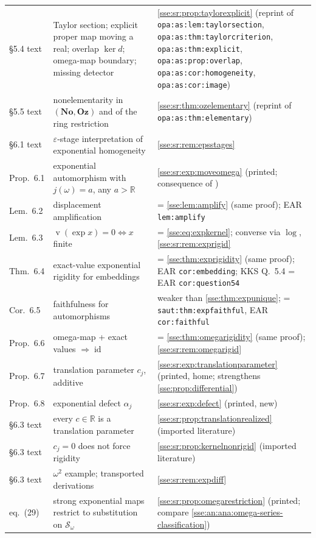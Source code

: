 \documentclass[11pt,a4paper]{article}
\numberwithin{equation}{section}
\theoremstyle{plain}
\theoremstyle{definition}
\theoremstyle{remark}
\newcommand{\No}{\mathbf{No}}
\newcommand{\Oz}{\mathbf{Oz}}
\newcommand{\R}{\mathbb{R}}
\newcommand{\id}{\operatorname{id}}
\newcommand{\val}{\operatorname{v}}
\newcommand{\lbl}[1]{\nolinkurl{#1}}%
\newcommand{\OmSeriessr}{\mathcal{S}_{\omega}}%
\begin{document}
\begin{longtable}{P{17mm}P{52mm}P{79mm}}
\S5.4 text & Taylor section; explicit proper map moving a real; overlap $\ker d$; omega-map boundary; missing detector & \cref{sse:sr:prop:taylorexplicit} (reprint of \lbl{opa:as:lem:taylorsection}, \lbl{opa:as:thm:taylorcriterion}, \lbl{opa:as:thm:explicit}, \lbl{opa:as:prop:overlap}, \lbl{opa:as:cor:homogeneity}, \lbl{opa:as:cor:image}) \\
\S5.5 text & nonelementarity in $(\No,\Oz)$ and of the ring restriction & \cref{sse:sr:thm:ozelementary} (reprint of \lbl{opa:as:thm:elementary}) \\
\S6.1 text & $\varepsilon$-stage interpretation of exponential homogeneity & \cref{sse:sr:rem:epsstages} \\
Prop.~6.1 & exponential automorphism with $j(\omega)=a$, any $a>\R$ & \cref{sse:sr:exp:moveomega} (printed; consequence of \cite[Rem.~2.10]{KKS}) \\
Lem.~6.2 & displacement amplification & = \cref{sse:lem:amplify} (same proof); EAR \lbl{lem:amplify} \\
Lem.~6.3 & $\val(\exp x)=0\iff x$ finite & = \eqref{sse:eq:expkernel}; converse via $\log$, \cref{sse:sr:rem:exprigid} \\
Thm.~6.4 & exact-value exponential rigidity for embeddings & = \cref{sse:thm:exprigidity} (same proof); EAR \lbl{cor:embedding}; KKS Q.~5.4 = EAR \lbl{cor:question54} \\
Cor.~6.5 & faithfulness for automorphisms & weaker than \cref{sse:thm:expunique}; = \lbl{saut:thm:expfaithful}, EAR \lbl{cor:faithful} \\
Prop.~6.6 & omega-map + exact values $\Rightarrow\id$ & = \cref{sse:thm:omegarigidity} (same proof); \cref{sse:sr:rem:omegarigid} \\
Prop.~6.7 & translation parameter $c_j$, additive & \cref{sse:sr:exp:translationparameter} (printed, home; strengthens \cref{sse:prop:differential}) \\
Prop.~6.8 & exponential defect $\alpha_j$ & \cref{sse:sr:exp:defect} (printed, new) \\
\S6.3 text & every $c\in\R$ is a translation parameter & \cref{sse:sr:prop:translationrealized} (imported literature) \\
\S6.3 text & $c_j=0$ does not force rigidity & \cref{sse:sr:prop:kernelnonrigid} (imported literature) \\
\S6.3 text & $\omega^2$ example; transported derivations & \cref{sse:sr:rem:expdiff} \\
eq.~(29) & strong exponential maps restrict to substitution on $\OmSeriessr$ & \cref{sse:sr:prop:omegarestriction} (printed; compare \cref{sse:an:ana:omega-series-classification}) \\

\end{longtable}
\end{document}
